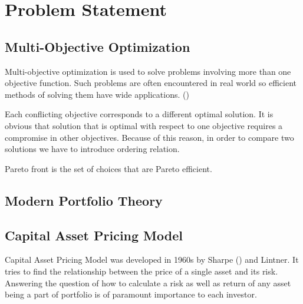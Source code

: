 \chapter{Problem Statement}
\label{cha:multiObjectiveOptimization}




\section{Multi-Objective Optimization}
\label{sec:strukturaDokumentu}

Multi-objective optimization is used to solve problems involving more than one objective function.
Such problems are often encountered in real world so efficient methods of solving them have wide applications.
(\cite{Deb:2001:MOU:559152})


Each conflicting objective corresponds to a different optimal solution.  
It is obvious that solution that is optimal with respect to one objective requires a compromise in other objectives.
Because of this reason, in order to compare two solutions we have to introduce ordering relation.

Pareto front is the set of choices that are Pareto efficient. 


\section{Modern Portfolio Theory}


\section{Capital Asset Pricing Model}


Capital Asset Pricing Model was developed in 1960s by Sharpe (\cite{CAPM-Sharpe}) and Lintner.
It tries to find the relationship between the price of a single asset and its risk.
Answering the question of how to calculate a risk as well as return of any asset being a part of portfolio is of paramount importance to each investor.

